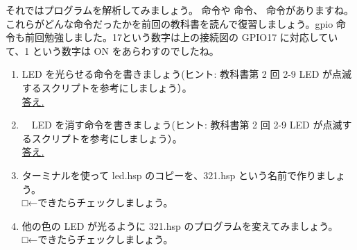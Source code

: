 それではプログラムを解析してみましょう。 命令や  命令、  命令がありますね。これらがどんな命令だったかを前回の教科書を読んで復習しましょう。gpio 命令も前回勉強しました。17という数字は上の接続図の GPIO17 に対応していて、1 という数字は ON をあらわすのでしたね。\\

\begin{tcolorbox}[title=\useOmetoi]
\begin{enumerate}
\item LED を光らせる命令を書きましょう(ヒント: 教科書第 2 回 2-9 LED が点滅するスクリプトを参考にしましょう）。\\
\underline{答え.\hspace{0.8\linewidth}}
\item　LED を消す命令を書きましょう(ヒント: 教科書第 2 回 2-9 LED が点滅するスクリプトを参考にしましょう）。\\
\underline{答え.\hspace{0.8\linewidth}}
\item ターミナルを使って led.hsp のコピーを、321.hsp という名前で作りましょう。\\
□←できたらチェックしましょう。
\item 他の色の LED が光るように 321.hsp のプログラムを変えてみましょう。\\
□←できたらチェックしましょう。
\end{enumerate}
\end{tcolorbox}

